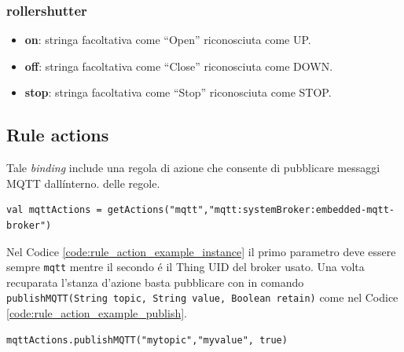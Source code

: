 \subsubsection{rollershutter}
\begin{itemize}
    \item \textbf{on}: stringa facoltativa come ``Open'' riconosciuta come UP.
    \item \textbf{off}: stringa facoltativa come ``Close'' riconosciuta come DOWN.
    \item \textbf{stop}: stringa facoltativa come ``Stop'' riconosciuta come STOP.
\end{itemize}

\subsection{Rule actions}
Tale {\em binding} include una regola di azione che consente di pubblicare messaggi MQTT dall\'interno. delle regole.

\begin{lstlisting}[caption=Esempio Rule Action Istanza,label=code:rule_action_example_instance]
val mqttActions = getActions("mqtt","mqtt:systemBroker:embedded-mqtt-broker")
\end{lstlisting}

Nel Codice \ref{code:rule_action_example_instance} il primo parametro deve essere sempre \texttt{mqtt} mentre il secondo \'e il Thing UID del broker usato. Una volta recuparata l'stanza d'azione basta pubblicare con in comando \texttt{publishMQTT(String topic, String value, Boolean retain)} come nel Codice \ref{code:rule_action_example_publish}.

\begin{lstlisting}[caption=Esempio Rule Action Pubblicazione,label=code:rule_action_example_publish]
mqttActions.publishMQTT("mytopic","myvalue", true)
\end{lstlisting}